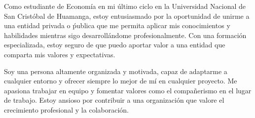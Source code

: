 
\par{

    Como estudiante de Economía en mi último ciclo en la Universidad Nacional de San Cristóbal de Huamanga, estoy entusiasmado por la oportunidad de unirme a una entidad privada o ṕublica que me permita aplicar mis conocimientos y habilidades mientras sigo desarrollándome profesionalmente. Con una formación especializada, estoy seguro de que puedo aportar valor a una entidad que comparta mis valores y expectativas.

    Soy una persona altamente organizada y motivada, capaz de adaptarme a cualquier entorno y ofrecer siempre lo mejor de mí en cualquier proyecto. Me apasiona trabajar en equipo y fomentar valores como el compañerismo en el lugar de trabajo. Estoy ansioso por contribuir a una organización que valore el crecimiento profesional y la colaboración.






}